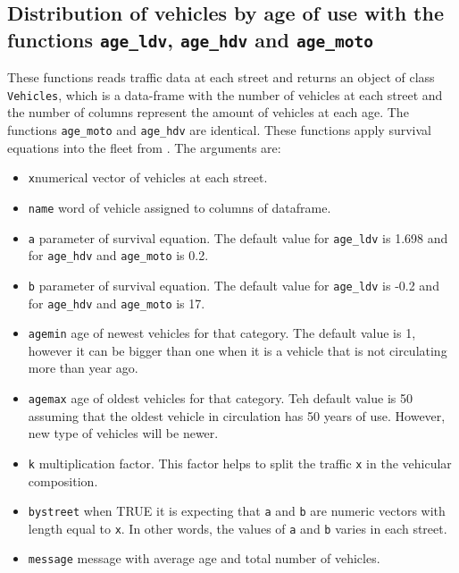 \documentclass[12pt,graybox,envcountchap,sectrefs]{krantz}
\providecommand{\tightlist}{%
  \setlength{\itemsep}{0pt}\setlength{\parskip}{0pt}}
\theoremstyle{definition}
\theoremstyle{definition}
\theoremstyle{definition}
\theoremstyle{remark}
\begin{document}
\subsection{\texorpdfstring{Distribution of vehicles by age of use with
the functions \texttt{age\_ldv}, \texttt{age\_hdv} and
\texttt{age\_moto}}{Distribution of vehicles by age of use with the functions age\_ldv, age\_hdv and age\_moto}}\label{distribution-of-vehicles-by-age-of-use-with-the-functions-age_ldv-age_hdv-and-age_moto}

These functions reads traffic data at each street and returns an object
of class \texttt{Vehicles}, which is a data-frame with the number of
vehicles at each street and the number of columns represent the amount
of vehicles at each age. The functions \texttt{age\_moto} and
\texttt{age\_hdv} are identical. These functions apply survival
equations into the fleet from \citet{MMA2011}. The arguments are:

\begin{itemize}
\tightlist
\item
  \texttt{x}numerical vector of vehicles at each street.
\item
  \texttt{name} word of vehicle assigned to columns of dataframe.
\item
  \texttt{a} parameter of survival equation. The default value for
  \texttt{age\_ldv} is 1.698 and for \texttt{age\_hdv} and
  \texttt{age\_moto} is 0.2.
\item
  \texttt{b} parameter of survival equation. The default value for
  \texttt{age\_ldv} is -0.2 and for \texttt{age\_hdv} and
  \texttt{age\_moto} is 17.
\item
  \texttt{agemin} age of newest vehicles for that category. The default
  value is 1, however it can be bigger than one when it is a vehicle
  that is not circulating more than year ago.
\item
  \texttt{agemax} age of oldest vehicles for that category. Teh default
  value is 50 assuming that the oldest vehicle in circulation has 50
  years of use. However, new type of vehicles will be newer.
\item
  \texttt{k} multiplication factor. This factor helps to split the
  traffic \texttt{x} in the vehicular composition.
\item
  \texttt{bystreet} when TRUE it is expecting that \texttt{a} and
  \texttt{b} are numeric vectors with length equal to \texttt{x}. In
  other words, the values of \texttt{a} and \texttt{b} varies in each
  street.
\item
  \texttt{message} message with average age and total number of
  vehicles.
\end{itemize}
\end{document}
